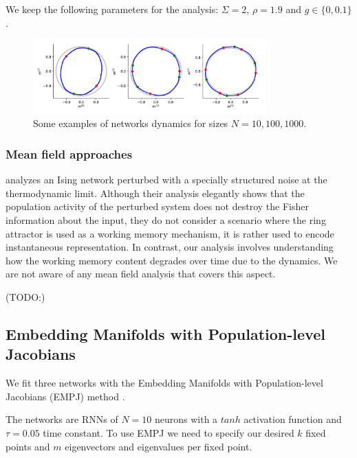\documentclass{article} %
\newcommand{\ascomment}[1]{\textcolor{ascolor}{(#1)}}
\newcounter{ct}
\theoremstyle{definition}
\theoremstyle{remark}
\begin{document}
We keep the following parameters for the analysis:
\(\Sigma=2\),
\(\rho=1.9\) and
\(g\in\{0, 0.1\}\).


\begin{figure}[h]
\centering
\includegraphics[width=0.8\textwidth]{N100_si2_rho1.9_g0_fp4.8.12}
\caption{Some examples of networks dynamics for sizes \(N=10,100,1000\).}\label{fig:low_rank_examples}
\end{figure}


\subsubsection{Mean field approaches}
\citep{kuhn2023information} analyzes an Ising network perturbed with a specially structured noise at the thermodynamic limit.
Although their analysis elegantly shows that the population activity of the perturbed system does not destroy the Fisher information about the input, they do not consider a scenario where the ring attractor is used as a working memory mechanism, it is rather used to encode instantaneous representation.
In contrast, our analysis involves understanding how the working memory content degrades over time due to the dynamics. We are not aware of any mean field analysis that covers this aspect.


\ascomment{TODO:}

\citep{spalla2021continuous}


\citep{wu2008dynamics}


\citep{battista2020capacity}


\citep{wojtak2023robust}


\citep{can2021emergence}


\subsection{Embedding Manifolds with Population-level Jacobians}\label{sec:supp:empj}
We fit three networks with the Embedding Manifolds with Population-level Jacobians (EMPJ) method \citep{pollock2020}.

The networks are RNNs of $N=10$ neurons with a $tanh$ activation function and $\tau = 0.05$ time constant.
 To use EMPJ we need to specify our desired $k$ fixed points and $m$ eigenvectors and eigenvalues per fixed point.
\end{document}
